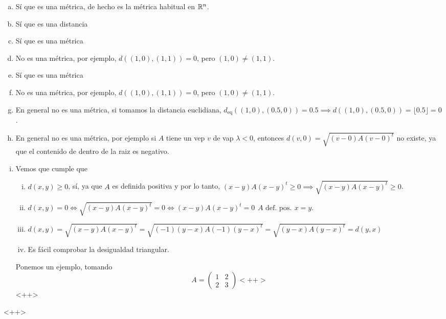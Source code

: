 \begin{ej}
	\begin{enumerate}[(a)]
		\item Sí que es una m\'etrica, de hecho es la m\'etrica habitual en $\mathbb{R}^n$.
			\begin{center}
				
			\end{center}
		\item Sí que es una distancia
			\begin{center}
				
			\end{center}
		\item Sí que es una m\'etrica
			\begin{center}
				
			\end{center}
		\item No es una m\'etrica, por ejemplo, $d\left( (1,0), (1,1) \right) = 0$, pero $(1,0) \neq (1,1)$.
		\item Sí que es una m\'etrica
			\begin{center}
				
			\end{center}
		\item No es una m\'etrica, por ejemplo, $d\left( (1,0), (1,1) \right) = 0$, pero $(1,0) \neq (1,1)$.
		\item En general no  es una m\'etrica, si tomamos la distancia euclidiana, $d_{\text{eq}} \left( (1, 0) , (0.5, 0) \right) = 0.5 \implies
			d\left( (1,0), (0.5, 0) \right) = \lfloor0.5 \rfloor = 0$.
		\item En general no es una m\'etrica, por ejemplo si $A$ tiene un vep $v$ de vap $\lambda < 0$, entonces $d(v, 0) = \sqrt{(v - 0) A (v-0)^t}$ no existe,
			ya que el contenido de dentro de la raiz es negativo.
		\item Vemos que cumple que
			\begin{enumerate}[i)]
				\item $d(x, y) \geq 0$, sí, ya que $A$ es definida positiva y por lo tanto, $(x-y)A(x-y)^t \geq 0 \implies \sqrt{(x-y)A(x-y)^t} \geq 0$.
				\item $d(x, y) = 0 \iff \sqrt{(x-y)A(x-y)^t} = 0 \iff (x-y)A(x-y)^t = 0 \substack{A \text{ def. pos.}} x = y$.
				\item $d(x, y) = \sqrt{(x-y)A(x-y)^t} = \sqrt{(-1)(y-x)A(-1)(y-x)^t} = \sqrt{(y-x)A(y-x)^t} = d(y, x)$
				\item Es fácil comprobar la desigualdad triangular.
			\end{enumerate}
			Ponemos un ejemplo, tomando
			\[
				A =
				\begin{pmatrix}
					1 & 2 \\
					2 & 3
				\end{pmatrix}<++>
			\]<++>
	\end{enumerate}<++>
\end{ej}
